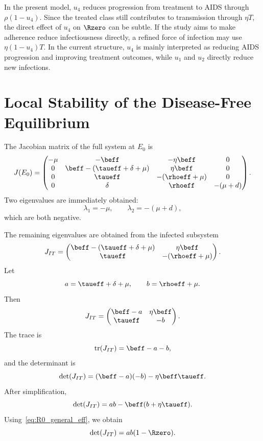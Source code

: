 \begin{remarkbox}[title={Important interpretation of $u_4$}]
In the present model, $u_4$ reduces progression from treatment to AIDS through $\rho(1-u_4)$. Since the treated class still contributes to transmission through $\eta T$, the direct effect of $u_4$ on $\Rzero$ can be subtle. If the study aims to make adherence reduce infectiousness directly, a refined force of infection may use $\eta(1-u_4)T$. In the current structure, $u_4$ is mainly interpreted as reducing AIDS progression and improving treatment outcomes, while $u_1$ and $u_2$ directly reduce new infections.
\end{remarkbox}

\section{Local Stability of the Disease-Free Equilibrium}

The Jacobian matrix of the full system at $E_0$ is
\[
J(E_0)=
\begin{pmatrix}
-\mu & -\beff & -\eta\beff & 0\\
0 & \beff-(\taueff+\delta+\mu) & \eta\beff & 0\\
0 & \taueff & -(\rhoeff+\mu) & 0\\
0 & \delta & \rhoeff & -(\mu+d)
\end{pmatrix}.
\]
Two eigenvalues are immediately obtained:
\[
\lambda_1=-\mu,
\qquad
\lambda_2=-(\mu+d),
\]
which are both negative.

The remaining eigenvalues are obtained from the infected subsystem
\[
J_{IT}=
\begin{pmatrix}
\beff-(\taueff+\delta+\mu) & \eta\beff\\
\taueff & -(\rhoeff+\mu)
\end{pmatrix}.
\]
Let
\[
a=\taueff+\delta+\mu,
\qquad
b=\rhoeff+\mu.
\]
Then
\[
J_{IT}=
\begin{pmatrix}
\beff-a & \eta\beff\\
\taueff & -b
\end{pmatrix}.
\]
The trace is
\[
\operatorname{tr}(J_{IT})=\beff-a-b,
\]
and the determinant is
\[
\det(J_{IT})
=
(\beff-a)(-b)-\eta\beff\taueff.
\]
After simplification,
\begin{equation}
\det(J_{IT})
=
ab-\beff(b+\eta\taueff).
\label{eq:det_simplified}
\end{equation}
Using~\eqref{eq:R0_general_eff}, we obtain
\begin{equation}
\det(J_{IT})=ab(1-\Rzero).
\label{eq:det_R0_relation}
\end{equation}


